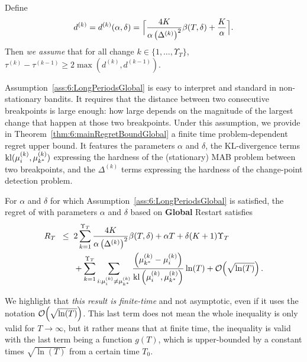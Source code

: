\begin{assumption}
    \label{ass:6:LongPeriodsGlobal}
    Define
    \begin{equation}\label{def:6:DelayGlobal}
        d^{(k)} = d^{(k)}(\alpha,\delta) = \Bigl\lceil \frac{4K}{\alpha\left(\Delta^{(k)}\right)^2}\beta(T,\delta) + \frac{K}{\alpha} \Bigr\rceil.
    \end{equation}
    Then \emph{we assume} that for all change $k \in \{1,\dots,\Upsilon_T\}$,
    $\tau^{(k)} - \tau^{(k-1)} \geq 2\max (d^{(k)},d^{(k-1)})$.
\end{assumption}

Assumption~\ref{ass:6:LongPeriodsGlobal} is easy to interpret and standard in non-stationary bandits.
It requires that the distance between two consecutive breakpoints is large enough: how large depends on the magnitude of the largest change that happen at those two breakpoints.
Under this assumption, we provide in Theorem~\ref{thm:6:mainRegretBoundGlobal} a finite time problem-dependent regret upper bound.
It features the parameters $\alpha$ and $\delta$,
the KL-divergence terms $\mathrm{kl}(\mu_{i}^{(k)},\mu_{k^*}^{(k)})$ expressing the hardness of the (stationary) MAB problem between two breakpoints,
and the $\Delta^{(k)}$ terms expressing the hardness of the change-point detection problem.

\begin{theorem}\label{thm:6:mainRegretBoundGlobal}
    For $\alpha$ and $\delta$ for which Assumption~\ref{ass:6:LongPeriodsGlobal} is satisfied, the regret of \GLRklUCB{} with parameters $\alpha$ and $\delta$ based on \textbf{Global} Restart satisfies
    \begin{align}
        R_T \;\; \leq \;\; & 2\sum_{k=1}^{\Upsilon_T} \frac{4K}{\alpha \left(\Delta^{(k)}\right)^2}\beta(T,\delta) +\alpha T + \delta (K+1)\Upsilon_T \\
        & + \sum_{k=1}^{\Upsilon_T}\sum_{i : \mu_i^{(k)} \neq \mu_{k^*}^{(k)}} \frac{\left( \mu_{k^*}^{(k)}-\mu_i^{(k)}\right)}{\mathrm{kl}\left(\mu_i^{(k)},\mu_{k^*}^{(k)}\right)}\ln(T) + \mathop{}\mathopen{}\mathcal{O}\mathopen{}\left(\sqrt{\ln(T)}\right). \nonumber
    \end{align}
\end{theorem}

We highlight that \emph{this result is finite-time} and not asymptotic, even if it uses the notation $\mathop{}\mathopen{}\mathcal{O}\mathopen{}\left(\sqrt{\ln(T)}\right)$.
This last term does not mean the whole inequality is only valid for $T\to\infty$, but it rather means that at finite time, the inequality is valid with the last term being a function $g(T)$, which is upper-bounded by a constant times $\sqrt{\ln(T)}$ from a certain time $T_0$.

